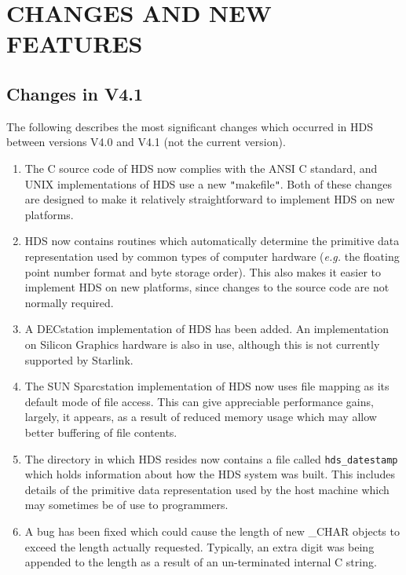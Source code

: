 \documentclass[11pt]{article}
\newcommand{\xlabel}[1]{}
\newcommand{\hi}[1]{{\tt{#1}}}
\newcommand{\qt}[1]{``#1''}
\newcommand{\st}[1]{{\em{#1}}}
\renewcommand{\qt}[1]{{\tt{"}}#1{\tt{"}}}
\begin{document}
\newpage
\section{\xlabel{changes_and_new_features}CHANGES AND NEW FEATURES}

\subsection{Changes in V4.1}

The following describes the most significant changes which occurred in HDS
between versions V4.0 and V4.1 (not the current version).

\begin{enumerate}

\item
The C source code of HDS now complies with the ANSI C standard, and
UNIX implementations of HDS use a new \qt{makefile}. Both of these
changes are designed to make it relatively straightforward to
implement HDS on new platforms.

\item
HDS now contains routines which automatically determine the primitive
data representation used by common types of computer hardware
(\st{e.g.} the floating point number format and byte storage
order). This also makes it easier to implement HDS on new platforms,
since changes to the source code are not normally required.

\item
A DECstation implementation of HDS has been added. An implementation
on Silicon Graphics hardware is also in use, although this is not
currently supported by Starlink.

\item
The SUN Sparcstation implementation of HDS now uses file mapping as
its default mode of file access. This can give appreciable performance
gains, largely, it appears, as a result of reduced memory usage which
may allow better buffering of file contents.

\item
The directory in which HDS resides now contains a file called
\hi{hds\_datestamp} which holds information about how the HDS system
was built. This includes details of the primitive data representation
used by the host machine which may sometimes be of use to programmers.

\item
A bug has been fixed which could cause the length of new \_CHAR
objects to exceed the length actually requested. Typically, an extra
digit was being appended to the length as a result of an un-terminated
internal C string.


\end{enumerate}
\end{document}

